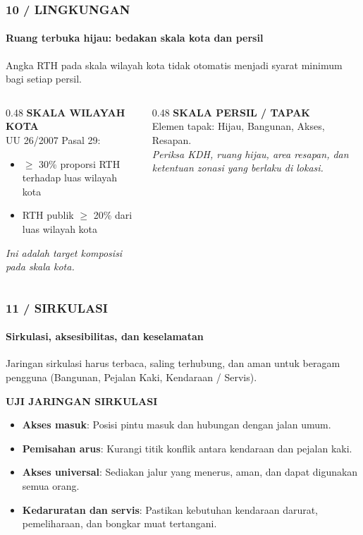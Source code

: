 \documentclass[../main.tex]{subfiles}
\begin{document}
\begin{frame}[mytitle=standard,t]
	\frametitle{10 / LINGKUNGAN}
	\framesubtitle{Ruang terbuka hijau: bedakan skala kota dan persil}

	Angka RTH pada skala wilayah kota tidak otomatis menjadi syarat minimum bagi setiap persil.

	\vspace{0.3cm}
	\begin{columns}[T]
		\begin{column}{0.48\textwidth}
			\textbf{SKALA WILAYAH KOTA}\\
			UU 26/2007 \textbullet{} Pasal 29:
			\begin{itemize}
				\item $\ge$ 30\% proporsi RTH terhadap luas wilayah kota
				\item RTH publik $\ge$ 20\% dari luas wilayah kota
			\end{itemize}
			\textit{Ini adalah target komposisi pada skala kota.}
		\end{column}

		\begin{column}{0.48\textwidth}
			\textbf{SKALA PERSIL / TAPAK}\\
			Elemen tapak: Hijau, Bangunan, Akses, Resapan.
			\vspace{0.3cm}\\
			\textit{Periksa KDH, ruang hijau, area resapan, dan ketentuan zonasi yang berlaku di lokasi.}
		\end{column}
	\end{columns}
\end{frame}

\begin{frame}[mytitle=imageplus,t]
	\frametitle{11 / SIRKULASI}
	\framesubtitle{Sirkulasi, aksesibilitas, dan keselamatan}

	Jaringan sirkulasi harus terbaca, saling terhubung, dan aman untuk beragam pengguna (Bangunan, Pejalan Kaki, Kendaraan / Servis).

	\vspace{0.3cm}
	\textbf{UJI JARINGAN SIRKULASI}
	\begin{itemize}
		\item \textbf{Akses masuk}: Posisi pintu masuk dan hubungan dengan jalan umum.
		\item \textbf{Pemisahan arus}: Kurangi titik konflik antara kendaraan dan pejalan kaki.
		\item \textbf{Akses universal}: Sediakan jalur yang menerus, aman, dan dapat digunakan semua orang.
		\item \textbf{Kedaruratan dan servis}: Pastikan kebutuhan kendaraan darurat, pemeliharaan, dan bongkar muat tertangani.
	\end{itemize}
\end{frame}
\end{document}
